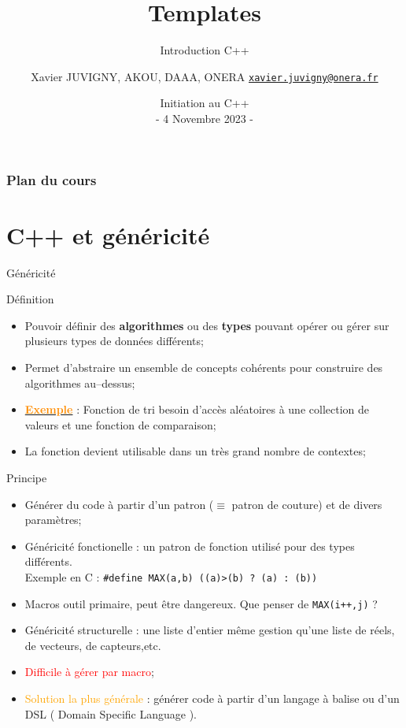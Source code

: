 \documentclass[compress,10pt,aspectratio=169]{beamer}
\title[Initiation C++\hspace{2em}]{Templates}
\subtitle{Introduction C++}
\author[X. JUVIGNY]{Xavier JUVIGNY, AKOU, DAAA, ONERA \href{mailto:xavier.juvigny@onera.fr}{\texttt{xavier.juvigny@onera.fr}} }
\date[04/11/2023]{Initiation au C++ \\- 4 Novembre 2023 -}
\institute{\inst{1}ONERA,\inst{2}DAAA}
\begin{document}
\begin{frame}
 \titlepage
\end{frame}

\begin{frame}
\frametitle{Plan du cours}
\tableofcontents
\end{frame}

\section{C++ et généricité}

\begin{frame}[fragile]{Généricité}
    \scriptsize\vspace*{-3mm}
  \begin{block}{\small Définition}
    \begin{itemize}
    \item Pouvoir définir des \textbf{algorithmes} ou des \textbf{types} pouvant opérer ou gérer
          sur plusieurs types de données différents;
    \item Permet d'abstraire un ensemble de concepts cohérents pour construire des algorithmes 
          au--dessus;
    \item \underline{\textbf{\textcolor{darkorange}{Exemple}}} : Fonction de tri besoin d'accès aléatoires à 
          une collection de valeurs et une fonction de comparaison;
    \item La fonction devient utilisable dans un très grand nombre de contextes;
    \end{itemize}
  \end{block}
  
  \begin{block}{\small Principe}
    \begin{itemize}
    \item Générer du code à partir d'un patron ($\equiv$ patron de couture) et de divers paramètres;
    \item {\color{blue}Généricité fonctionelle} : un patron de fonction utilisé pour des types 
          différents.\\ \textcolor{NavyBlue}{Exemple en C} : 
          \texttt{#define MAX(a,b) ((a)>(b) ? (a) : (b))}
    \item Macros outil primaire, peut être dangereux. Que penser de \texttt{MAX(i++,j)} ?
    \item {\color{blue}Généricité structurelle} : une liste d'entier même gestion qu'une liste de 
          réels, de vecteurs, de capteurs,etc.
    \item \textcolor{red}{Difficile à gérer par macro};
    \item \textcolor{orange}{Solution la plus générale} : générer code à partir d'un langage à balise ou d'un DSL 
          ( Domain Specific Language ).
    \end{itemize}
  \end{block}
  \end{frame}
  
\end{document}

